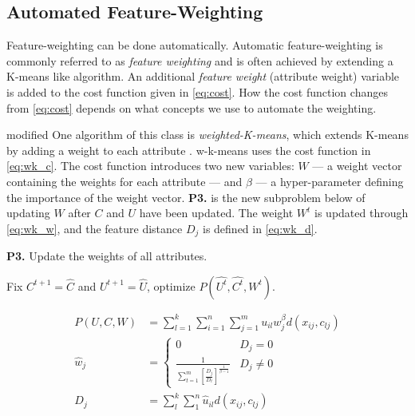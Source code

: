 \documentclass[../report.tex]{subfiles}
\begin{document}
\subsection{Automated Feature-Weighting}
Feature-weighting can be done automatically. Automatic feature-weighting is commonly referred to as \textit{feature weighting} and is often achieved by extending a K-means like algorithm. An additional \textit{feature weight} (attribute weight) variable is added to the cost function given in \cref{eq:cost}. How the cost function changes from \cref{eq:cost} depends on what concepts we use to automate the weighting.

\begin{color}{modified}
One algorithm of this class is \textit{weighted-K-means}, which extends K-means by adding a weight to each attribute \cite{huang2005automated}. w-k-means uses the cost function in \cref{eq:wk_c}. The cost function introduces two new variables: $W$ --- a weight vector containing the weights for each attribute --- and $\beta$ --- a hyper-parameter defining the importance of the weight vector. \textbf{P3.} is the new subproblem below of updating $W$ after $C$ and $U$ have been updated. The weight $W^t$ is updated through \cref{eq:wk_w}, and the feature distance $D_j$ is defined in \cref{eq:wk_d}.

\vspace{4mm}
\begin{description}
  \label{desc:P3}
\item \textbf{P3.} \quad Update the weights of all attributes.
    \begin{description}
      \item Fix $C^{t+1} = \hat{C}$ and $U^{t+1} = \hat{U}$, optimize $P(\hat{U^{t}}, \hat{ C^{t} }, W^{t})$.
    \end{description}
\end{description}
\vspace{4mm}

\begin{align}
  \label{eq:wk_c}
  P(U,C,W) &= \sum^k_{l=1} \sum^n_{i=1} \sum^m_{j=1} u_{il} w_j^{\beta} d(x_{ij},c_{lj}) \\
  \label{eq:wk_w}
  \hat{w}_j &=
  \begin{cases}
    0 & D_j = 0 \\
    \frac{1}{ \sum^m_{t=1} [\frac{ D_j }{ D_t }]^{ \frac{ 1 }{ \beta - 1 } } } & D_j \neq 0
  \end{cases} \\
  \label{eq:wk_d}
  D_j &= \sum^{ k }_{ l }{\sum^n_1 {\hat{u}_{il} d(x_{ ij }, c_ { lj } )}}
\end{align}


\end{color}
\end{document}
